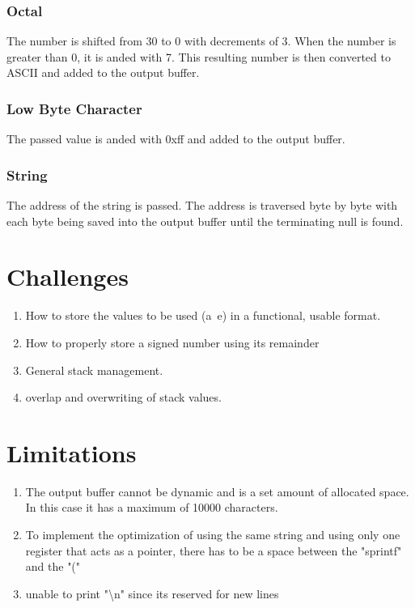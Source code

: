 \documentclass[12pt,a4paper]{article}
\begin{document}
\subsubsection{Octal}
The number is shifted from 30 to 0 with decrements of 3. When the number is greater than 0, it is anded with 7. This resulting number is then converted to ASCII and added to the output buffer.

\subsubsection{Low Byte Character}
The passed value is anded with 0xff and added to the output buffer.

\subsubsection{String}
The address of the string is passed. The address is traversed byte by byte with each byte being saved into the output buffer until the terminating null is found.


\section{Challenges}
\begin{enumerate}
\item How to store the values to be used (a~e) in a functional, usable format.
\item How to properly store a signed number using its remainder
\item General stack management.
\item overlap and overwriting of stack values.
\end{enumerate}


\section{Limitations}
\begin{enumerate}
\item The output buffer cannot be dynamic and is a set amount of allocated space. In this case it has a maximum of 10000 characters.
\item To implement the optimization of using the same string and using only one register that acts as a pointer, there has to be a space between the "sprintf" and the "("
\item unable to print "\textbackslash n" since its reserved for new lines
\end{enumerate}
\end{document}
